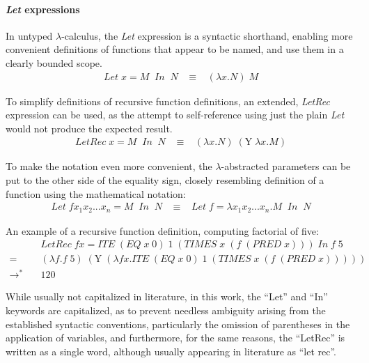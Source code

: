 \documentclass[table, a4paper, 10pt]{article}
\begin{document}
\paragraph{\textit{Let} expressions}
In untyped $\lambda$-calculus, the \textit{Let} expression
is a syntactic shorthand, enabling more convenient
definitions of functions that appear to be named, and use them
in a clearly bounded scope. 
\begin{align*}
\mathit{Let}\;x = M\;\;\mathit{In}\;\;N \;\;\;\equiv\;\;\;(\lambda x.N)\;M
\end{align*}

\noindent
To simplify definitions of recursive function definitions, an extended,
\textit{LetRec} expression can be used, as the attempt to self-reference
using just the plain \textit{Let} would not produce the expected result.
\begin{align*}
\mathit{LetRec}\;x = M\;\;\mathit{In}\;\;N \;\;\;\equiv\;\;\;(\lambda x.N)\;(\mathrm{Y}\;\lambda x.M)
\end{align*}

\noindent
To make the notation even more convenient, the $\lambda$-abstracted parameters can be put
to the other side of the equality sign, closely resembling 
definition of a function using the mathematical notation:
\begin{align*}
\mathit{Let}\;f x_1 x_2 ... x_n = M\;\;\mathit{In}\;\;N \;\;\;\equiv\;\;\;\mathit{Let}\;f = \lambda x_1 x_2 ... x_n.M\;\;\mathit{In}\;\;N
\end{align*}

\noindent
An example of a recursive function definition, computing factorial of five:
\begin{align*}
&\mathit{Let Rec}\;f x = \mathit{ITE}\;(\mathit{EQ}\;x\;\mathit{0})\;\mathit{1}\;(\mathit{TIMES}\;x\;(f\;(\mathit{PRED}\;x)))\;\mathit{In}\;f\;\mathit{5}\\
=\;\;\quad&(\lambda f.f\;\mathit{5})\;(\mathrm{Y}\;(\lambda fx.\mathit{ITE}\;(\mathit{EQ}\;x\;\mathit{0})\;\mathit{1}\;(\mathit{TIMES}\;x\;(f\;(\mathit{PRED}\;x)))))\\
\to^\ast\quad&\mathit{120}
\end{align*}

\noindent
While usually not capitalized in literature,
in this work, the ``Let'' and ``In'' keywords are capitalized,
as to prevent needless ambiguity arising
from the established syntactic conventions, particularly the omission
of parentheses in the application of variables, and furthermore,
for the same reasons, the ``LetRec'' is written as a single word,
although usually appearing in literature as ``let rec''.
\end{document}
